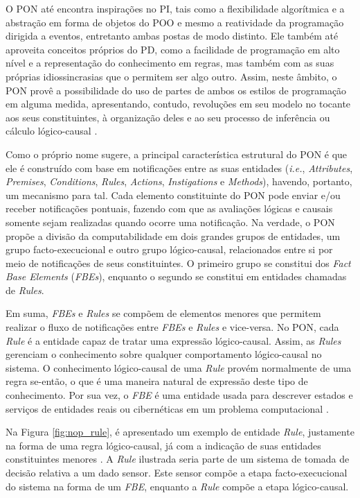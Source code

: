 O PON até encontra inspirações no PI, tais como a flexibilidade algorítmica e a
abstração em forma de objetos do POO e mesmo a reatividade da programação
dirigida a eventos, entretanto ambas postas de modo distinto. Ele também
até aproveita conceitos próprios do PD, como a facilidade de programação em alto
nível e a representação do conhecimento em regras, mas também com as suas
próprias idiossincrasias que o permitem ser algo outro. Assim, neste âmbito, o
PON provê a possibilidade do uso de partes de ambos os estilos de programação em
alguma medida, apresentando, contudo, revoluções em seu modelo no tocante aos seus
constituintes, à organização deles e ao seu processo de inferência ou cálculo
lógico-causal \cite{pat_simao_2008,simao_2009,doc_ronszcka_2019}.

Como o próprio nome sugere, a principal característica estrutural do PON é que
ele é construído com base em notificações entre as suas entidades
(\textit{i.e.}, \textit{Attributes}, \textit{Premises}, \textit{Conditions},
\textit{Rules}, \textit{Actions}, \textit{Instigations} e \textit{Methods}),
havendo, portanto, um mecanismo para tal. Cada elemento constituinte do PON pode
enviar e/ou receber notificações pontuais, fazendo com que as avaliações lógicas
e causais somente sejam realizadas quando ocorre uma notificação. Na verdade, o
PON propõe a divisão da computabilidade em dois grandes grupos de entidades, um
grupo facto-execucional e outro grupo lógico-causal, relacionados entre si por
meio de notificações de seus constituintes. O primeiro grupo se constitui dos
\textit{Fact Base Elements} (\textit{FBEs}), enquanto o segundo se constitui em
entidades chamadas de \textit{Rules}.

Em suma, \textit{FBEs} e \textit{Rules} se compõem de elementos menores que
permitem realizar o fluxo de notificações entre \textit{FBEs} e \textit{Rules} e
vice-versa. No PON, cada \textit{Rule} é a entidade capaz de tratar uma
expressão lógico-causal. Assim, as \textit{Rules} gerenciam o conhecimento sobre
qualquer comportamento lógico-causal no sistema. O conhecimento lógico-causal de
uma \textit{Rule} provém normalmente de uma regra se-então, o que é uma maneira
natural de expressão deste tipo de conhecimento. Por sua vez, o \textit{FBE} é
uma entidade usada para descrever estados e serviços de entidades reais ou
cibernéticas em um problema computacional \cite{msc_Banaszewski_2009}.

Na Figura \ref{fig:nop_rule}, é apresentado um exemplo de entidade
\textit{Rule}, justamente na forma de uma regra lógico-causal, já com a
indicação de suas entidades constituintes menores \cite{neves_icist_2021}. A
\textit{Rule} ilustrada seria parte de um sistema de tomada de decisão relativa
a um dado sensor. Este sensor compõe a etapa facto-execucional do sistema na
forma de um \textit{FBE}, enquanto a \textit{Rule} compõe a etapa lógico-causal.

